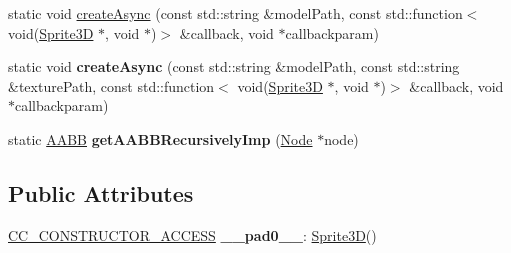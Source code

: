 \begin{DoxyCompactItemize}
\item 
static void \hyperlink{classSprite3D_a9348148a6cdef8745ba31a593ea47273}{create\+Async} (const std\+::string \&model\+Path, const std\+::function$<$ void(\hyperlink{classSprite3D}{Sprite3D} $\ast$, void $\ast$)$>$ \&callback, void $\ast$callbackparam)
\item 
\mbox{\label{classSprite3D_aaf6ddab4db30cd2e017a36c892dd1a9f}} 
static void {\bfseries create\+Async} (const std\+::string \&model\+Path, const std\+::string \&texture\+Path, const std\+::function$<$ void(\hyperlink{classSprite3D}{Sprite3D} $\ast$, void $\ast$)$>$ \&callback, void $\ast$callbackparam)
\item 
\mbox{\label{classSprite3D_a7b36bbde92cfdad4beea19886c4bc7ba}} 
static \hyperlink{classAABB}{A\+A\+BB} {\bfseries get\+A\+A\+B\+B\+Recursively\+Imp} (\hyperlink{classNode}{Node} $\ast$node)
\end{DoxyCompactItemize}
\subsection*{Public Attributes}
\begin{DoxyCompactItemize}
\item 
\mbox{\label{classSprite3D_a41b990bc98086225b03e5e77f36aee63}} 
\hyperlink{_2cocos2d_2cocos_2base_2ccConfig_8h_a25ef1314f97c35a2ed3d029b0ead6da0}{C\+C\+\_\+\+C\+O\+N\+S\+T\+R\+U\+C\+T\+O\+R\+\_\+\+A\+C\+C\+E\+SS} {\bfseries \+\_\+\+\_\+pad0\+\_\+\+\_\+}\+: \hyperlink{classSprite3D}{Sprite3D}()
\end{DoxyCompactItemize}
